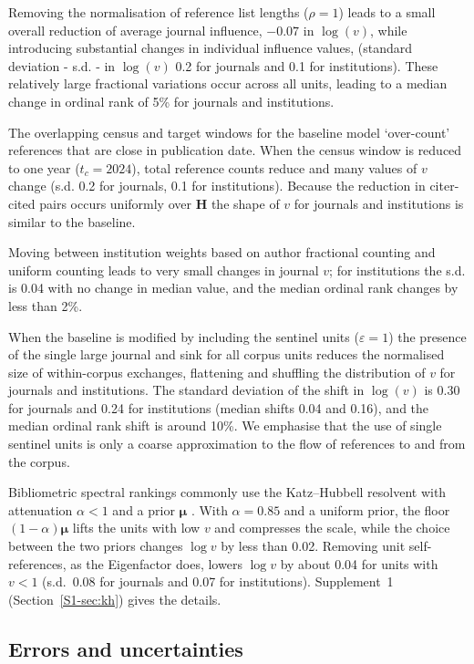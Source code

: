 Removing the normalisation of reference list lengths ($\rho{=}1$)
leads to a small overall reduction of average journal influence, $-0.07$ in $\log(v)$, while introducing substantial changes in individual influence values, (standard deviation - s.d. - in $\log(v)$ 0.2 for journals and 0.1 for institutions). These relatively large fractional variations occur across all units, leading to a median change in ordinal rank of 5\% for journals and institutions. 

The overlapping census and target windows for the baseline model `over-count' references that are close in publication date. When the census window is reduced to one year ($t_c=2024$), total reference counts reduce and many values of $v$ change  (s.d. 0.2 for journals, 0.1 for institutions). Because the reduction in citer-cited pairs occurs uniformly over $\mathbf{H}$ the shape of $v$ for journals and institutions is similar to the baseline.

Moving between institution weights based on author fractional counting and uniform counting leads to very small changes in journal $v$; for institutions the s.d. is 0.04 with no change in median value, and the median ordinal rank changes by less than 2\%.

When the baseline is modified by including the sentinel units ($\varepsilon=1$) the presence of the single large journal and sink for all corpus units reduces the normalised size of within-corpus exchanges, flattening and shuffling the distribution of $v$ for journals and institutions. The standard deviation of the shift in $\log(v)$ is 0.30 for journals and 0.24 for institutions (median shifts 0.04 and 0.16), and the median ordinal rank shift is around 10\%. We emphasise that the use of single sentinel units is only a coarse approximation to the flow of references to and from the corpus.

Bibliometric spectral rankings commonly use the Katz--Hubbell resolvent with attenuation $\alpha<1$ and a prior $\boldsymbol{\mu}$ \citep{bollenJournalStatus2006, bergstromEigenfactorMetrics2008}. With $\alpha=0.85$ and a uniform prior, the floor $(1-\alpha)\boldsymbol{\mu}$ lifts the units with low $v$ and compresses the scale, while the choice between the two priors changes $\log v$ by less than 0.02. Removing unit self-references, as the Eigenfactor does, lowers $\log v$ by about 0.04 for units with $v<1$ (s.d.\ 0.08 for journals and 0.07 for institutions). Supplement~1 (Section~\ref{S1-sec:kh}) gives the details.

\subsection{Errors and uncertainties}
\label{sec:errors}

